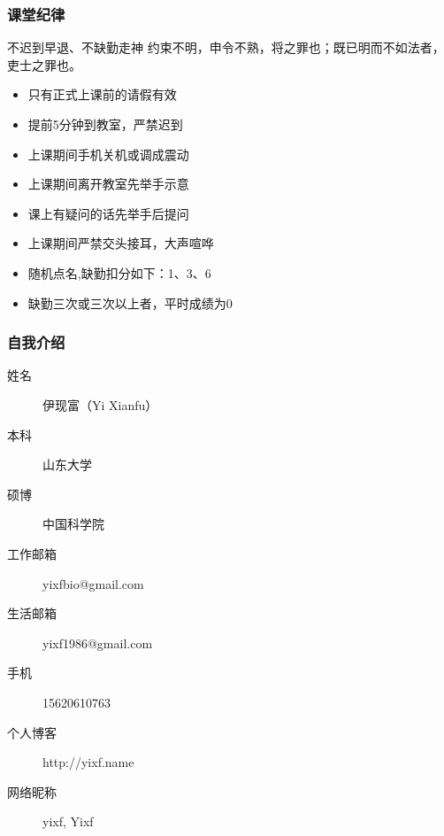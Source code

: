 \begin{frame}
  \frametitle{课堂纪律}
  \begin{alertblock}{不迟到早退、不缺勤走神}
  约束不明，申令不熟，将之罪也；既已明而不如法者，吏士之罪也。
  \end{alertblock}
  \pause
  \begin{itemize}[<+-|alert@+>]
    \item 只有正式上课前的请假有效
    \item 提前5分钟到教室，严禁迟到
    \item 上课期间手机关机或调成震动
    \item 上课期间离开教室先举手示意
    \item 课上有疑问的话先举手后提问
    \item 上课期间严禁交头接耳，大声喧哗
    \item 随机点名,缺勤扣分如下：1、3、6
    \item 缺勤三次或三次以上者，平时成绩为0
  \end{itemize}
\end{frame}

\begin{frame}
  \frametitle{自我介绍}
    \begin{description}
      \item[姓\qquad 名]伊现富（Yi Xianfu）
      \item[本\qquad 科]山东大学
      \item[硕\qquad 博]中国科学院
      \item[工作邮箱]\alert{yixfbio@gmail.com}
      \item[生活邮箱]yixf1986@gmail.com
      \item[手\qquad 机]15620610763
      \item[个人博客]http://yixf.name
      \item[网络昵称]yixf, Yixf
    \end{description}
\end{frame}


